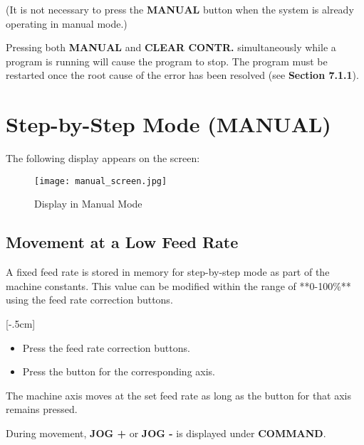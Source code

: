 \noindent (It is not necessary to press the \textbf{MANUAL} button when the system is already operating in manual mode.)

Pressing both \textbf{MANUAL} and \textbf{CLEAR CONTR.} simultaneously while a program is running will cause the program to stop. The program must be restarted once the root cause of the error has been resolved (see \textbf{Section 7.1.1}).

\newpage
\section{Step-by-Step Mode (MANUAL)}

\begin{itemize}
\end{itemize}

The following display appears on the screen:

\begin{figure}[h]
    \centering
    \texttt{[image: manual\_screen.jpg]}
    \caption{Display in Manual Mode}
\end{figure}

\subsection{Movement at a Low Feed Rate}

A fixed feed rate is stored in memory for step-by-step mode as part of the machine constants. This value can be modified within the range of **0-100\%** using the feed rate correction buttons.

\procedure

[-.5cm]

\begin{itemize}
    \item Press the feed rate correction buttons.
\end{itemize}

\begin{itemize}
    \item Press the button for the corresponding axis.
\end{itemize}

The machine axis moves at the set feed rate as long as the button for that axis remains pressed.

During movement, \textbf{JOG +} or \textbf{JOG -} is displayed under \textbf{COMMAND}.

